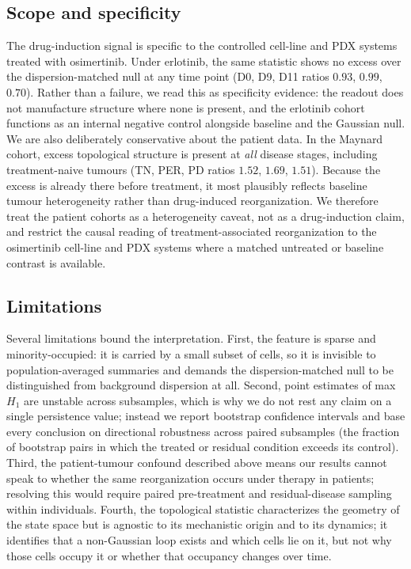 \subsection*{Scope and specificity}

The drug-induction signal is specific to the controlled cell-line and PDX
systems treated with osimertinib. Under erlotinib, the same statistic
shows no excess over the dispersion-matched null at any time point (D0,
D9, D11 ratios $0.93$, $0.99$, $0.70$). Rather than a failure, we read
this as specificity evidence: the readout does not manufacture structure
where none is present, and the erlotinib cohort functions as an internal
negative control alongside baseline and the Gaussian null. We are also
deliberately conservative about the patient data. In the Maynard cohort,
excess topological structure is present at \emph{all} disease stages,
including treatment-naive tumours (TN, PER, PD ratios $1.52$, $1.69$,
$1.51$). Because the excess is already there before treatment, it most
plausibly reflects baseline tumour heterogeneity rather than
drug-induced reorganization. We therefore treat the patient cohorts as a
heterogeneity caveat, not as a drug-induction claim, and restrict the
causal reading of treatment-associated reorganization to the osimertinib
cell-line and PDX systems where a matched untreated or baseline contrast
is available.

\subsection*{Limitations}

Several limitations bound the interpretation. First, the feature is
sparse and minority-occupied: it is carried by a small subset of cells,
so it is invisible to population-averaged summaries and demands the
dispersion-matched null to be distinguished from background dispersion at
all. Second, point estimates of max $H_1$ are unstable across subsamples,
which is why we do not rest any claim on a single persistence value;
instead we report bootstrap confidence intervals and base every
conclusion on directional robustness across paired subsamples (the
fraction of bootstrap pairs in which the treated or residual condition
exceeds its control). Third, the patient-tumour confound described above
means our results cannot speak to whether the same reorganization occurs
under therapy in patients; resolving this would require paired
pre-treatment and residual-disease sampling within individuals. Fourth,
the topological statistic characterizes the geometry of the state space
but is agnostic to its mechanistic origin and to its dynamics; it
identifies that a non-Gaussian loop exists and which cells lie on it, but
not why those cells occupy it or whether that occupancy changes over time.

